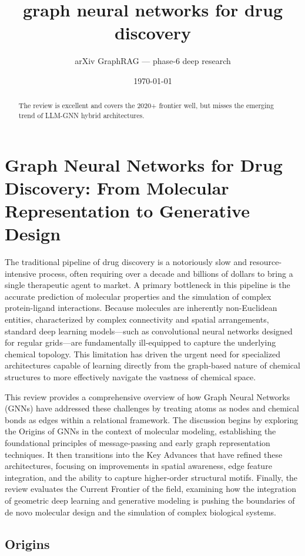 \documentclass[11pt]{article}
\title{graph neural networks for drug discovery}
\author{arXiv GraphRAG --- phase-6 deep research}
\date{\today}
\begin{document}
\maketitle

\begin{abstract}
The review is excellent and covers the 2020+ frontier well, but misses the emerging trend of LLM-GNN hybrid architectures.
\end{abstract}

\section{Graph Neural Networks for Drug Discovery: From Molecular Representation to Generative Design}

The traditional pipeline of drug discovery is a notoriously slow and resource-intensive process, often requiring over a decade and billions of dollars to bring a single therapeutic agent to market. A primary bottleneck in this pipeline is the accurate prediction of molecular properties and the simulation of complex protein-ligand interactions. Because molecules are inherently non-Euclidean entities, characterized by complex connectivity and spatial arrangements, standard deep learning models—such as convolutional neural networks designed for regular grids—are fundamentally ill-equipped to capture the underlying chemical topology. This limitation has driven the urgent need for specialized architectures capable of learning directly from the graph-based nature of chemical structures to more effectively navigate the vastness of chemical space.

This review provides a comprehensive overview of how Graph Neural Networks (GNNs) have addressed these challenges by treating atoms as nodes and chemical bonds as edges within a relational framework. The discussion begins by exploring the Origins of GNNs in the context of molecular modeling, establishing the foundational principles of message-passing and early graph representation techniques. It then transitions into the Key Advances that have refined these architectures, focusing on improvements in spatial awareness, edge feature integration, and the ability to capture higher-order structural motifs. Finally, the review evaluates the Current Frontier of the field, examining how the integration of geometric deep learning and generative modeling is pushing the boundaries of de novo molecular design and the simulation of complex biological systems.

\subsection{Origins}
\end{document}
